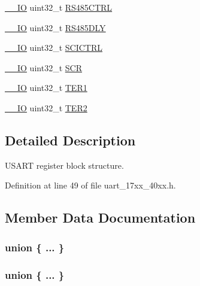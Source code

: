 \begin{DoxyCompactItemize}
\hyperlink{core__cm3_8h_aec43007d9998a0a0e01faede4133d6be}{\+\_\+\+\_\+\+IO} uint32\+\_\+t \hyperlink{structLPC__USART__T_a6a7e49f50f49efbe8e11befcf6e7d6b4}{R\+S485\+C\+T\+RL}
\item 
\hyperlink{core__cm3_8h_aec43007d9998a0a0e01faede4133d6be}{\+\_\+\+\_\+\+IO} uint32\+\_\+t \hyperlink{structLPC__USART__T_a6e9fc8109a269820386a36c81dc943ab}{R\+S485\+D\+LY}
\item 
\hyperlink{core__cm3_8h_aec43007d9998a0a0e01faede4133d6be}{\+\_\+\+\_\+\+IO} uint32\+\_\+t \hyperlink{structLPC__USART__T_aa8ad1461441995d0b618ff7f5b0e42be}{S\+C\+I\+C\+T\+RL}
\item 
\hyperlink{core__cm3_8h_aec43007d9998a0a0e01faede4133d6be}{\+\_\+\+\_\+\+IO} uint32\+\_\+t \hyperlink{structLPC__USART__T_a28417e4b3d19fcbb6c6ef116376ed58b}{S\+CR}
\item 
\hyperlink{core__cm3_8h_aec43007d9998a0a0e01faede4133d6be}{\+\_\+\+\_\+\+IO} uint32\+\_\+t \hyperlink{structLPC__USART__T_afa3989925f4b5c3edd74531748ccccb2}{T\+E\+R1}
\item 
\hyperlink{core__cm3_8h_aec43007d9998a0a0e01faede4133d6be}{\+\_\+\+\_\+\+IO} uint32\+\_\+t \hyperlink{structLPC__USART__T_afc422e0333356dc62b23d404bfdbd1de}{T\+E\+R2}
\end{DoxyCompactItemize}


\subsection{Detailed Description}
U\+S\+A\+RT register block structure. 

Definition at line 49 of file uart\+\_\+17xx\+\_\+40xx.\+h.



\subsection{Member Data Documentation}
\subsubsection[{\texorpdfstring{"@10}{@10}}]{\setlength{\rightskip}{0pt plus 5cm}union \{ ... \} }\hypertarget{structLPC__USART__T_ac0cf78c9ab208ce0d9d50044a3acc880}{}\label{structLPC__USART__T_ac0cf78c9ab208ce0d9d50044a3acc880}
\subsubsection[{\texorpdfstring{"@12}{@12}}]{\setlength{\rightskip}{0pt plus 5cm}union \{ ... \} }\hypertarget{structLPC__USART__T_acc75f0787768dcc1b66c96058f85da62}{}\label{structLPC__USART__T_acc75f0787768dcc1b66c96058f85da62}
